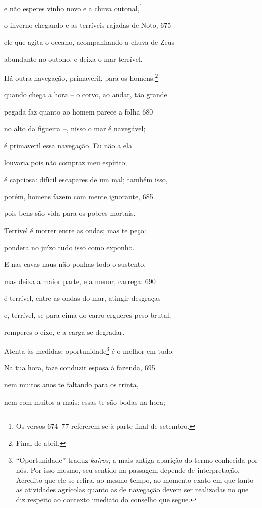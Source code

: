 e não esperes vinho novo e a chuva outonal,\footnote{Os versos 674--77 refererem-se à parte final de setembro.}

o inverno chegando e as terríveis rajadas de Noto, \num{675}

ele que agita o oceano, acompanhando a chuva de Zeus

abundante no outono, e deixa o mar terrível.

Há outra navegação, primaveril, para os homens:\footnote{Final de abril.}

quando chega a hora -- o corvo, ao andar, tão grande

pegada faz quanto ao homem parece a folha \num{680}

no alto da figueira --, nisso o mar é navegável;

é primaveril essa navegação. Eu não a ela

louvaria pois não compraz meu espírito;

é capciosa: difícil escapares de um mal; também isso,

porém, homens fazem com mente ignorante, \num{685}

pois bens são vida para os pobres mortais.

Terrível é morrer entre as ondas; mas te peço:

pondera no juízo tudo isso como exponho.

E nas cavas naus não ponhas todo o sustento,

mas deixa a maior parte, e a menor, carrega: \num{690}

é terrível, entre as ondas do mar, atingir desgraças

e, terrível, se para cima do carro ergueres peso brutal,

romperes o eixo, e a carga se degradar.

Atenta às medidas; oportunidade\footnote{``Oportunidade'' traduz \emph{kairos}, a mais antiga aparição do
termo conhecida por nós. Por isso mesmo, seu sentido na passagem depende
de interpretação. Acredito que ele se refira, ao mesmo tempo, ao momento
exato em que tanto as atividades agrícolas quanto as de navegação devem
ser realizadas no que diz respeito ao contexto imediato do conselho que
segue.} é o melhor em tudo.

Na tua hora, faze conduzir esposa à fazenda, \num{695}

nem muitos anos te faltando para os trinta,

nem com muitos a mais: essas te são bodas na hora;

